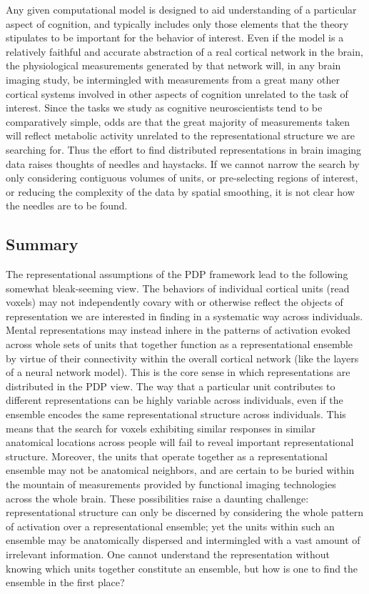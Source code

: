 \begin{APAenumerate}
Any given computational model is designed to aid understanding of a particular aspect of cognition, and typically includes only those elements that the theory stipulates to be important for the behavior of interest. Even if the model is a relatively faithful and accurate abstraction of a real cortical network in the brain, the physiological measurements generated by that network will, in any brain imaging study, be intermingled with measurements from a great many other cortical systems involved in other aspects of cognition unrelated to the task of interest. Since the tasks we study as cognitive neuroscientists tend to be comparatively simple, odds are that the great majority of measurements taken will reflect metabolic activity unrelated to the representational structure we are searching for. Thus the effort to find distributed representations in brain imaging data raises thoughts of needles and haystacks. If we cannot narrow the search by only considering contiguous volumes of units, or pre-selecting regions of interest, or reducing the complexity of the data by spatial smoothing, it is not clear how the needles are to be found.

\end{APAenumerate}

\subsection{Summary}
The representational assumptions of the PDP framework lead to the following somewhat bleak-seeming view. The behaviors of individual cortical units (read voxels) may not independently covary with or otherwise reflect the objects of representation we are interested in finding in a systematic way across individuals. Mental representations may instead inhere in the patterns of activation evoked across whole sets of units that together function as a representational ensemble by virtue of their connectivity within the overall cortical network (like the layers of a neural network model). This is the core sense in which representations are distributed in the PDP view. The way that a particular unit contributes to different representations can be highly variable across individuals, even if the ensemble encodes the same representational structure across individuals. This means that the search for voxels exhibiting similar responses in similar anatomical locations across people will fail to reveal important representational structure. Moreover, the units that operate together as a representational ensemble may not be anatomical neighbors, and are certain to be buried within the mountain of measurements provided by functional imaging technologies across the whole brain. These possibilities raise a daunting challenge: representational structure can only be discerned by considering the whole pattern of activation over a representational ensemble; yet the units within such an ensemble may be anatomically dispersed and intermingled with a vast amount of irrelevant information. One cannot understand the representation without knowing which units together constitute an ensemble, but how is one to find the ensemble in the first place?


